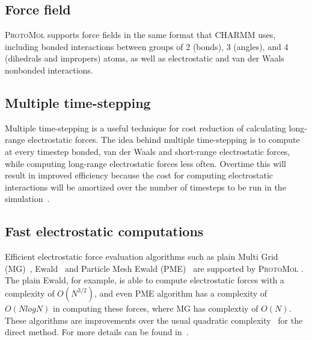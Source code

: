 \documentclass[11pt]{report}
\newcommand{\ProtoMol}{\textsc{ProtoMol }}
\begin{document}
\subsection{Force field}

\ProtoMol supports force fields in the same format that CHARMM uses,
including bonded interactions between groups of 2 (bonds), 3 (angles),
and 4 (dihedrals and impropers) atoms, as well as electrostatic and
van der Waals nonbonded interactions.


\subsection{Multiple time-stepping}

Multiple time-stepping is a useful technique for cost reduction of
calculating long-range electrostatic forces.  The idea behind multiple
time-stepping is to compute at every timestep bonded, van der Waals
and short-range electrostatic forces, while computing long-range
electrostatic forces less often.  Overtime this will result in
improved efficiency because the cost for computing electrostatic
interactions will be amortized over the number of timesteps to be run
in the simulation~\cite{BHAN01}.


\subsection{Fast electrostatic computations}

Efficient electrostatic force evaluation algorithms such as plain
Multi Grid (MG)~\cite{BrBB01,SkTH02,Matt02},
Ewald~\cite{Ewal21,dePS80a} and Particle Mesh Ewald
(PME)~\cite{DeHo98,HoEa81,DaYP93,EsPB95} are supported by
\ProtoMol .  The plain Ewald, for example, is able to compute
electrostatic forces with a complexity of \begin{math} O(N^{3/2})
\end{math}, and even PME algorithm has a complexity of \begin{math}
O(N log N) \end{math} in computing these forces, where MG has
complextiy of \begin{math} O(N) \end{math}.  These algorithms are
improvements over the usual quadratic complexity~\cite{BHAN01} for the
direct method. For more details  can be found in~\cite{Matt02}.
\end{document}
